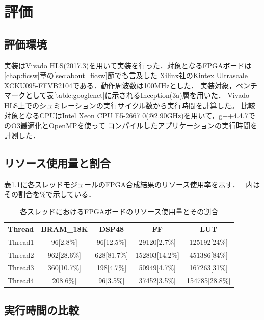 \chapter{評価}
{
\label{chap:eval}

\section{評価環境}
\label{sec:eval_env}
実装はVivado HLS(2017.3)を用いて実装を行った．対象となるFPGAボードは\ref{chap:ficsw}章の\ref{sec:about_ficsw}節でも言及した
Xilinx社のKintex Ultrascale　XCKU095-FFVB2104である．動作周波数は100MHzとした．
実装対象，ベンチマークとして表\ref{table:googlenet}に示されるInception(3a)層を用いた．
Vivado HLS上でのシュミレーションの実行サイクル数から実行時間を計算した。
比較対象となるCPUはIntel Xeon CPU E5-2667 0(@2.90GHz)を用いて，g++4.4.7でのO3最適化とOpenMPを使って
コンパイルしたアプリケーションの実行時間を計測した．

\section{リソース使用量と割合}
\label{sec:resource_util}
表\ref{table:resource_util}に各スレッドモジュールのFPGA合成結果のリソース使用率を示す．
[]内はその割合を\%で示している．

\begin{table}[p]
    \begin{center}
    \caption{各スレッドにおけるFPGAボードのリソース使用量とその割合}
    \label{table:resource_util}
    \begin{tabular}{|c|c|c|c|c|} \hline
    \multicolumn{1}{|c|}{Thread} & \multicolumn{1}{|c|}{BRAM\_18K} & \multicolumn{1}{|c|}{DSP48} & \multicolumn{1}{|c|}{FF} & \multicolumn{1}{|c|}{LUT} \\ \hline \hline
    Thread1       & 96[2.8\%] & 96[12.5\%] & 29120[2.7\%] & 125192[24\%] \\ \hline
    Thread2       & 962[28.6\%] & 628[81.7\%] & 152803[14.2\%] & 451386[84\%] \\ \hline
    Thread3       & 360[10.7\%] & 198[4.7\%] & 50949[4.7\%] & 167263[31\%] \\ \hline
    Thread4       & 208[6\%] & 96[3.5\%] & 37452[3.5\%] & 154785[28.8\%] \\ \hline
    \end{tabular}
    \end{center}
\end{table}


\section{実行時間の比較}
\label{sec:resource_util}

}
